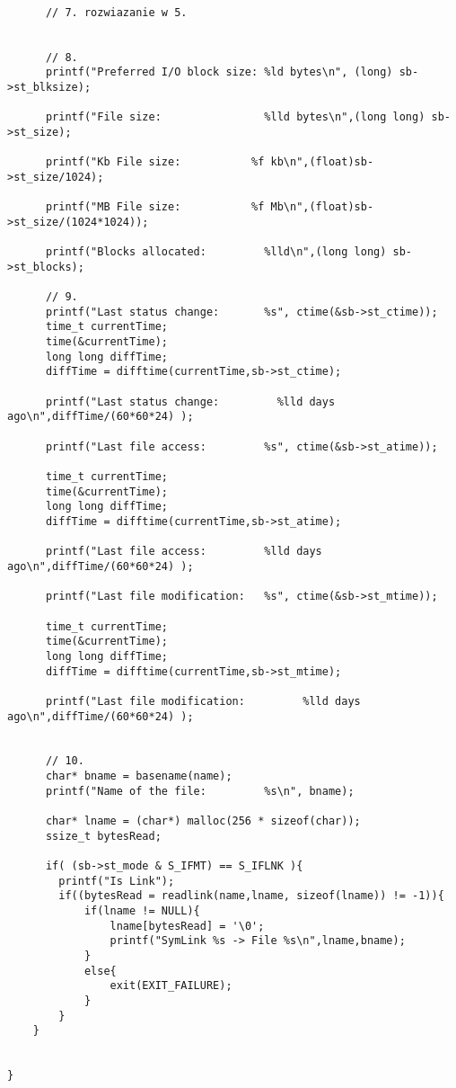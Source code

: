 \documentclass[a4paper,15pt]{article}
\begin{document}
\begin{lstlisting}[style=CStyle, label=some-code,caption=Zadania 4-10]
	  
	  // 7. rozwiazanie w 5.
	  
	  
	  // 8.
	  printf("Preferred I/O block size: %ld bytes\n", (long) sb->st_blksize);
      
	  printf("File size:                %lld bytes\n",(long long) sb->st_size);
 
      printf("Kb File size:           %f kb\n",(float)sb->st_size/1024);
  
	  printf("MB File size:           %f Mb\n",(float)sb->st_size/(1024*1024));
		
      printf("Blocks allocated:         %lld\n",(long long) sb->st_blocks);
      
      // 9. 
	  printf("Last status change:       %s", ctime(&sb->st_ctime));	  
	  time_t currentTime;
  	  time(&currentTime);
  	  long long diffTime;
	  diffTime = difftime(currentTime,sb->st_ctime);
		
	  printf("Last status change:         %lld days ago\n",diffTime/(60*60*24) );
	  
	  printf("Last file access:         %s", ctime(&sb->st_atime));
		
	  time_t currentTime;
  	  time(&currentTime);
  	  long long diffTime;
	  diffTime = difftime(currentTime,sb->st_atime);
		
	  printf("Last file access:         %lld days ago\n",diffTime/(60*60*24) );
	  
	  printf("Last file modification:   %s", ctime(&sb->st_mtime));
		
	  time_t currentTime;
  	  time(&currentTime);
  	  long long diffTime;
	  diffTime = difftime(currentTime,sb->st_mtime);
		
	  printf("Last file modification:         %lld days ago\n",diffTime/(60*60*24) );
	  
	  
	  // 10.
	  char* bname = basename(name);
      printf("Name of the file:         %s\n", bname);
		
	  char* lname = (char*) malloc(256 * sizeof(char));
	  ssize_t bytesRead;
	  
	  if( (sb->st_mode & S_IFMT) == S_IFLNK ){
		printf("Is Link");
		if((bytesRead = readlink(name,lname, sizeof(lname)) != -1)){
			if(lname != NULL){
		  		lname[bytesRead] = '\0';
		  		printf("SymLink %s -> File %s\n",lname,bname);
			}
			else{
		  		exit(EXIT_FAILURE);
			}
	  	} 
	}
	  
	  
}
\end{lstlisting}

\newpage
\end{document}
